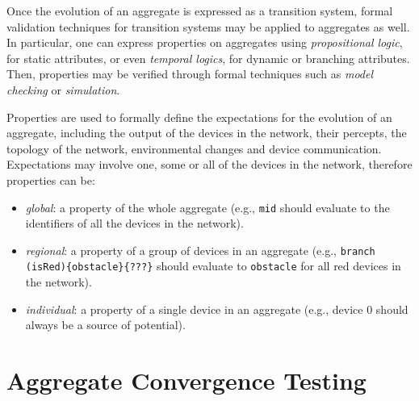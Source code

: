 Once the evolution of an aggregate is expressed as a transition system, formal
validation techniques for transition systems may be applied to aggregates as
well. In particular, one can express properties on aggregates using
\textit{propositional logic}, for static attributes, or even \textit{temporal
logics}, for dynamic or branching attributes. Then, properties may be verified
through formal techniques such as \textit{model checking} or
\textit{simulation}.

Properties are used to formally define the expectations for the evolution of an
aggregate, including the output of the devices in the network, their percepts,
the topology of the network, environmental changes and device communication.
Expectations may involve one, some or all of the devices in the network,
therefore properties can be:
\begin{itemize}
  \item \textit{global}: a property of the whole aggregate (e.g., \texttt{mid}
        should evaluate to the identifiers of all the devices in the network).
  \item \textit{regional}: a property of a group of devices in an aggregate
        (e.g., \texttt{branch (isRed)\{obstacle\}\{???\}} should evaluate to
        \texttt{obstacle} for all red devices in the network).
  \item \textit{individual}: a property of a single device in an aggregate
        (e.g., device 0 should always be a source of potential).
\end{itemize}

\section{Aggregate Convergence Testing}
\label{section:analysis:aggregate-convergence-testing}

